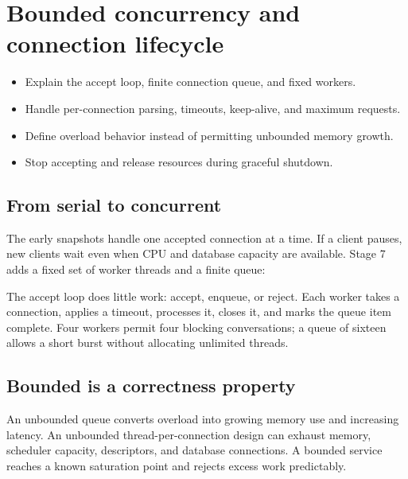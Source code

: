 \chapter{Bounded concurrency and connection lifecycle}

\begin{objectives}
\begin{itemize}
  \item Explain the accept loop, finite connection queue, and fixed workers.
  \item Handle per-connection parsing, timeouts, keep-alive, and maximum requests.
  \item Define overload behavior instead of permitting unbounded memory growth.
  \item Stop accepting and release resources during graceful shutdown.
\end{itemize}
\end{objectives}

\section{From serial to concurrent}

The early snapshots handle one accepted connection at a time. If a client pauses,
new clients wait even when CPU and database capacity are available. Stage 7 adds
a fixed set of worker threads and a finite queue:


The accept loop does little work: accept, enqueue, or reject. Each worker takes a
connection, applies a timeout, processes it, closes it, and marks the queue item
complete. Four workers permit four blocking conversations; a queue of sixteen
allows a short burst without allocating unlimited threads.

\section{Bounded is a correctness property}

An unbounded queue converts overload into growing memory use and increasing
latency. An unbounded thread-per-connection design can exhaust memory, scheduler
capacity, descriptors, and database connections. A bounded service reaches a
known saturation point and rejects excess work predictably.

